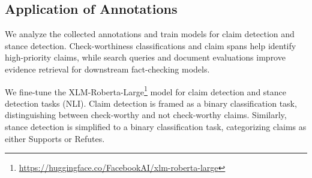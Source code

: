 \subsection{Application of Annotations}

We analyze the collected annotations and train models for claim detection and stance detection. Check-worthiness classifications and claim spans help identify high-priority claims, while search queries and document evaluations improve evidence retrieval for downstream fact-checking models.

We fine-tune the XLM-Roberta-Large\footnote{\url{https://huggingface.co/FacebookAI/xlm-roberta-large}} model for claim detection and stance detection tasks (NLI). Claim detection is framed as a binary classification task, distinguishing between check-worthy and not check-worthy claims. Similarly, stance detection is simplified to a binary classification task, categorizing claims as either Supports or Refutes. 

